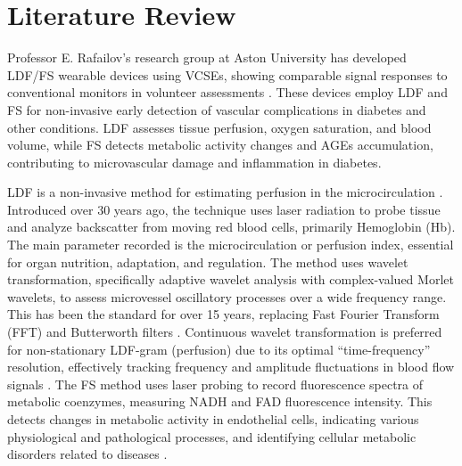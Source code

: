 \section{Literature Review}
\label{sec.literature_review}

Professor E. Rafailov's research group at Aston University has developed LDF/FS wearable devices using VCSEs, showing comparable signal responses to conventional monitors in volunteer assessments \cite{inproceedings19}. These devices employ LDF and FS for non-invasive early detection of vascular complications in diabetes and other conditions. LDF assesses tissue perfusion, oxygen saturation, and blood volume, while FS detects metabolic activity changes and AGEs accumulation, contributing to microvascular damage and inflammation in diabetes. 

LDF is a non-invasive method for estimating perfusion in the microcirculation \cite{low2020historical}. Introduced over 30 years ago, the technique uses laser radiation to probe tissue and analyze backscatter from moving red blood cells, primarily Hemoglobin (Hb). The main parameter recorded is the microcirculation or perfusion index, essential for organ nutrition, adaptation, and regulation. The method uses wavelet transformation, specifically adaptive wavelet analysis with complex-valued Morlet wavelets, to assess microvessel oscillatory processes over a wide frequency range. This has been the standard for over 15 years, replacing Fast Fourier Transform (FFT) and Butterworth filters \cite{kralj2023wavelet}. Continuous wavelet transformation is preferred for non-stationary LDF-gram (perfusion) due to its optimal ``time-frequency'' resolution, effectively tracking frequency and amplitude fluctuations in blood flow signals \cite{Loktionova:19}. The FS method uses laser probing to record fluorescence spectra of metabolic coenzymes, measuring NADH and FAD fluorescence intensity. This detects changes in metabolic activity in endothelial cells, indicating various physiological and pathological processes, and identifying cellular metabolic disorders related to diseases \cite{zharkikh2020biophotonics}. 




